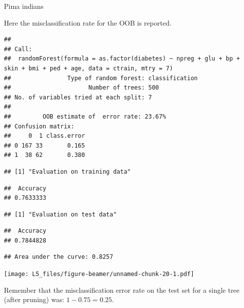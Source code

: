 \documentclass[
  ignorenonframetext,
]{beamer}
\begin{document}
\begin{frame}[fragile]

\begin{block}{Pima indians}

Here the misclassification rate for the OOB is reported.

\begin{verbatim}
## 
## Call:
##  randomForest(formula = as.factor(diabetes) ~ npreg + glu + bp +      skin + bmi + ped + age, data = ctrain, mtry = 7) 
##                Type of random forest: classification
##                      Number of trees: 500
## No. of variables tried at each split: 7
## 
##         OOB estimate of  error rate: 23.67%
## Confusion matrix:
##     0  1 class.error
## 0 167 33       0.165
## 1  38 62       0.380
\end{verbatim}

\begin{verbatim}
## [1] "Evaluation on training data"
\end{verbatim}

\begin{verbatim}
##  Accuracy 
## 0.7633333
\end{verbatim}

\begin{verbatim}
## [1] "Evaluation on test data"
\end{verbatim}

\begin{verbatim}
##  Accuracy 
## 0.7844828
\end{verbatim}

\begin{verbatim}
## Area under the curve: 0.8257
\end{verbatim}

\texttt{[image: L5\_files/figure-beamer/unnamed-chunk-20-1.pdf]}

Remember that the misclassification error rate on the test set for a
single tree (after pruning) was: \(1-0.75=0.25\).

\end{block}

\end{frame}
\end{document}
